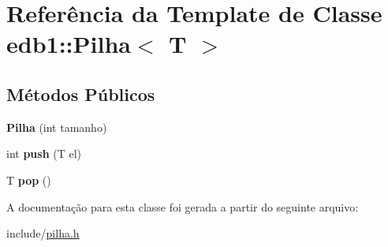 \hypertarget{classedb1_1_1_pilha}{}\section{Referência da Template de Classe edb1\+:\+:Pilha$<$ T $>$}
\label{classedb1_1_1_pilha}
\subsection*{Métodos Públicos}
\begin{DoxyCompactItemize}
\item 
\mbox{\label{classedb1_1_1_pilha_a42d127d97db6f2712286f93c52040560}} 
{\bfseries Pilha} (int tamanho)
\item 
\mbox{\label{classedb1_1_1_pilha_a134af53d5fcd1e526bca4e805b3da723}} 
int {\bfseries push} (T el)
\item 
\mbox{\label{classedb1_1_1_pilha_a62b9e1f82b51f7dab653e1632cd61819}} 
T {\bfseries pop} ()
\end{DoxyCompactItemize}


A documentação para esta classe foi gerada a partir do seguinte arquivo\+:\begin{DoxyCompactItemize}
\item 
include/\hyperlink{pilha_8h}{pilha.\+h}\end{DoxyCompactItemize}
